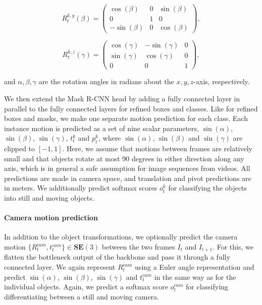 \begin{equation}
R_t^{k,y}(\beta) =
\begin{pmatrix}
  \cos(\beta) & 0 & \sin(\beta) \\
  0 & 1 & 0 \\
  -\sin(\beta) & 0 & \cos(\beta)
\end{pmatrix},
\end{equation}

\begin{equation}
R_t^{k,z}(\gamma) =
\begin{pmatrix}
  \cos(\gamma) & -\sin(\gamma) & 0 \\
  \sin(\gamma) & \cos(\gamma) & 0 \\
  0 & 0 & 1
\end{pmatrix},
\end{equation}

and $\alpha, \beta, \gamma$ are the rotation angles in radians about the $x,y,z$-axis, respectively.

We then extend the Mask R-CNN head by adding a fully connected layer in parallel to the fully connected layers for
refined boxes and classes.
Like for refined boxes and masks, we make one separate motion prediction for each class.
Each instance motion is predicted as a set of nine scalar parameters,
$\sin(\alpha)$, $\sin(\beta)$, $\sin(\gamma)$, $t_t^k$ and $p_t^k$,
where $\sin(\alpha)$, $\sin(\beta)$ and $\sin(\gamma)$ are clipped to $[-1, 1]$.
Here, we assume that motions between frames are relatively small
and that objects rotate at most 90 degrees in either direction along any axis,
which is in general a safe assumption for image sequences from videos.
All predictions are made in camera space, and translation and pivot predictions are in meters.
We additionally predict softmax scores $o_t^k$ for classifying the objects into
still and moving objects.

\paragraph{Camera motion prediction}
In addition to the object transformations, we optionally predict the camera motion $\{R_t^{cam}, t_t^{cam}\}\in \mathbf{SE}(3)$
between the two frames $I_t$ and $I_{t+1}$.
For this, we flatten the bottleneck output of the backbone and pass it through a fully connected layer.
We again represent $R_t^{cam}$ using a Euler angle representation and
predict $\sin(\alpha)$, $\sin(\beta)$, $\sin(\gamma)$ and $t_t^{cam}$ in the same way as for the individual objects.
Again, we predict a softmax score $o_t^{cam}$ for classifying differentiating between
a still and moving camera.

